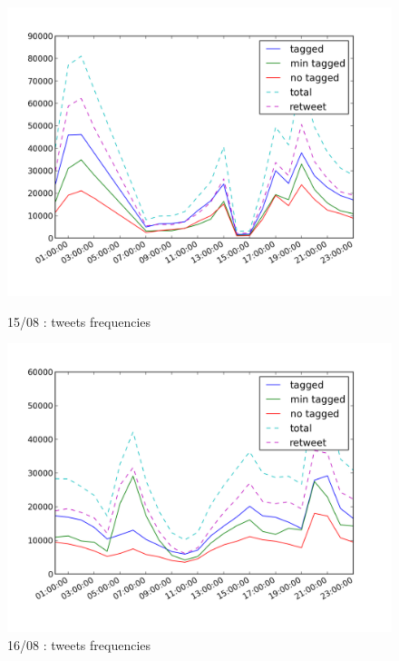 \documentclass[a4paper,12pt]{report}
\begin{document}
\begin{figure}[H]
\begin{minipage}[t]{0.48\textwidth}
\begin{center}
	\includegraphics[width=\textwidth]{images/freqs/freq_15_08.png}
	\caption{15/08 : tweets frequencies}
\end{center}
\end{minipage}
\hfill
\begin{minipage}[t]{0.48\textwidth}
\begin{center}
	\includegraphics[width=\textwidth]{images/freqs/freq_16_08.png}
	\caption{16/08 : tweets frequencies}
\end{center}
\end{minipage}
\end{figure}
\end{document}
